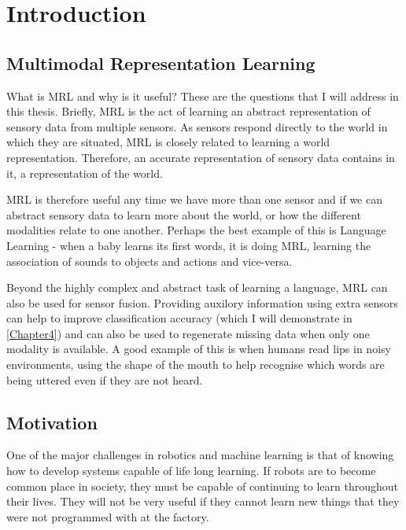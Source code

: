 
\chapter{Introduction} %

\label{Chapter1} %



\section{Multimodal Representation Learning}
What is \ac{MRL} and why is it useful? These are the questions that I will address in this thesis.
Briefly, \ac{MRL} is the act of learning an abstract representation of sensory data from multiple sensors. As sensors respond directly to the world in which they are situated, \ac{MRL} is closely related to learning a world representation. Therefore, an accurate representation of sensory data contains in it, a representation of the world.

\ac{MRL} is therefore useful any time we have more than one sensor and if we can abstract sensory data to learn more about the world, or how the different modalities relate to one another. Perhaps the best example of this is Language Learning - when a baby learns its first words, it is doing \ac{MRL}, learning the association of sounds to objects and actions and vice-versa.

Beyond the highly complex and abstract task of learning a language, \ac{MRL} can also be used for sensor fusion. Providing auxilory information using extra sensors can help to improve classification accuracy (which I will demonstrate in \autoref{Chapter4}) and can also be used to regenerate missing data when only one modality is available.  A good example of this is when humans read lips in noisy environments, using the shape of the mouth to help recognise which words are being uttered even if they are not heard.


\section{Motivation}
One of the major challenges in robotics and machine learning is that of knowing how to develop systems capable of life long learning. If robots are to become common place in society, they must be capable of continuing to learn throughout their lives. They will not be very useful if they cannot learn new things that they were not programmed with at the factory.

